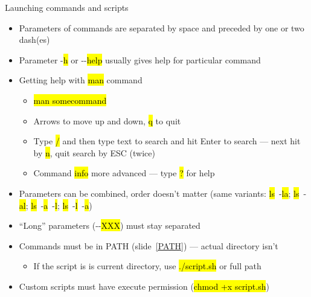 \documentclass[compress, ucs, xelatex, 11pt, xcolor=svgnames, aspectratio=169,
	hyperref={
		bookmarks=true,
		unicode=true,
		colorlinks=true,
		pdftitle={Linux, command line and MetaCentrum},
		plainpages=false,
		pdfauthor={Vojtech Zeisek},
		pdfsubject={Course about use of Linux command line, writing shell scripts and using MetaCentrum of CESNET},
		pdfcreator={XeLaTeX},
		pdfkeywords={Linux, GNU, BASH, shell, command line, MetaCentrum},
		linkcolor=DarkRed, %
		anchorcolor=DarkBlue, %
		citecolor=Indigo, %
		filecolor=NavyBlue, %
		menucolor=DarkMagenta, %
		urlcolor=DarkBlue, %
		pdftex},
	url={hyphens, lowtilde} %
	]{beamer}
\renewcommand{\texttt}[1]{\hl{\ttfamily #1}}
\begin{document}
\begin{frame}{Launching commands and scripts}
	\begin{itemize}
		\item Parameters of commands are separated by space and preceded by one or two dash(es)
		\item Parameter -\texttt{h} or -{-}\texttt{help} usually gives help for particular command
		\item Getting help with \texttt{man} command
		\begin{itemize}
			\item \texttt{man somecommand}
			\item Arrows to move up and down, \texttt{q} to quit
			\item Type \texttt{/} and then type text to search and hit Enter to search --- next hit by \texttt{n}, quit search by ESC (twice)
			\item Command \texttt{info} more advanced --- type \texttt{?} for help
		\end{itemize}
		\item Parameters can be combined, order doesn't matter (same variants: \texttt{ls}~-\texttt{la}; \texttt{ls}~-\texttt{al}; \texttt{ls}~-\texttt{a}~-\texttt{l}; \texttt{ls}~-\texttt{l}~-\texttt{a})
		\item \enquote{Long} parameters (-{-}\texttt{XXX}) must stay separated
		\item Commands must be in PATH (slide~\ref{PATH}) --- actual directory isn't
		\begin{itemize}
			\item If the script is is current directory, use \texttt{./script.sh} or full path
		\end{itemize}
		\item Custom scripts must have execute permission (\texttt{chmod +x script.sh})
	\end{itemize}
\end{frame}
\end{document}
